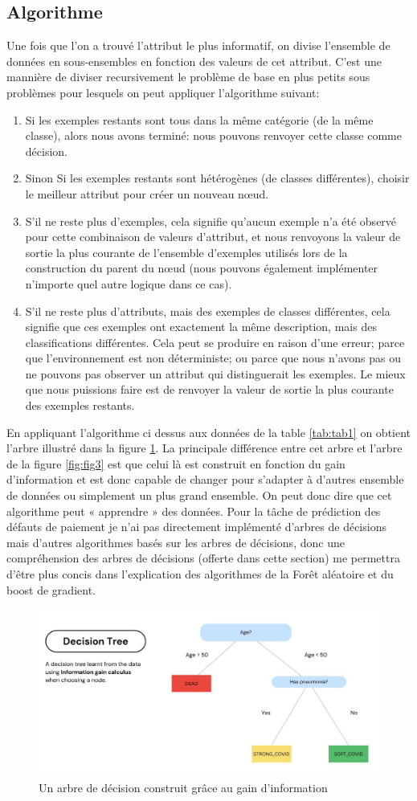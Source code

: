 \subsection{Algorithme}
\label{chap4.sec2.sub3}
Une fois que l'on a trouvé l'attribut le plus informatif, on divise l'ensemble de données en sous-ensembles en fonction des valeurs de cet attribut. C'est une mannière de diviser recursivement le problème de base en plus petits sous problèmes pour lesquels on peut appliquer l'algorithme suivant:

\begin{enumerate}
    \item Si les exemples restants sont tous dans la même catégorie (de la même classe), alors nous avons terminé: nous pouvons renvoyer cette classe comme décision.
    \item Sinon Si les exemples restants sont hétérogènes (de classes différentes), choisir le meilleur attribut pour créer un nouveau nœud.
    \item S'il ne reste plus d'exemples, cela signifie qu'aucun exemple n'a été observé pour cette combinaison de valeurs d'attribut, et nous renvoyons la valeur de sortie la plus courante de l'ensemble d'exemples utilisés lors de la construction du parent du nœud (nous pouvons également implémenter n'importe quel autre logique dans ce cas).
    \item S'il ne reste plus d'attributs, mais des exemples de classes différentes, cela signifie que ces exemples ont exactement la même description, mais des classifications différentes. Cela peut se produire en raison d'une erreur; parce que l'environnement est non déterministe; ou parce que nous n’avons pas ou ne pouvons pas observer un attribut qui distinguerait les exemples. Le mieux que nous puissions faire est de renvoyer la valeur de sortie la plus courante des exemples restants.
\end{enumerate}

En appliquant l'algorithme ci dessus aux données de la table \ref{tab:tab1} on obtient l'arbre illustré dans la figure \ref{fig:fig4}. La principale différence entre cet arbre et l'arbre de la figure \ref{fig:fig3} est que celui là est construit en fonction du gain d'information et est donc capable de changer pour s'adapter à d'autres ensemble de données ou simplement un plus grand ensemble. On peut donc dire que cet algorithme peut « apprendre » des données. Pour la tâche de prédiction des défauts de paiement je n'ai pas directement implémenté d'arbres de décisions mais d'autres algorithmes basés sur les arbres de décisions, donc une compréhension des arbres de décisions (offerte dans cette section) me permettra d'être plus concis dans l'explication des algorithmes de la Forêt aléatoire et du boost de gradient.

\begin{figure}
    \centering
    \includegraphics[width=0.75\linewidth]{images/DecisionTree2.jpg}
    \caption{Un arbre de décision construit grâce au gain d'information}
    \label{fig:fig4}
\end{figure}